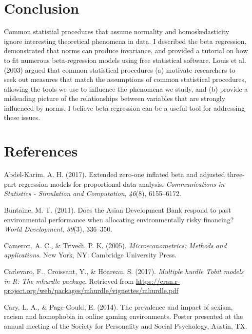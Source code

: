 \documentclass[english,man]{apa6}
\theoremstyle{definition}
\theoremstyle{definition}
\theoremstyle{remark}
\begin{document}
\section{Conclusion}\label{conclusion}

Common statistial procedures that assume normality and homoskedasticity
ignore interesting theoretical phenomena in data. I described the beta
regression, demonstrated that norms can produce invariance, and provided
a tutorial on how to fit numerous beta-regression models using free
statistical software. Louis et al. (2003) argued that common statistical
procedures (a) motivate researchers to seek out measures that match the
assumptions of common statistical procedures, allowing the tools we use
to influence the phenomena we study, and (b) provide a misleading
picture of the relationships between variables that are strongly
influenced by norms. I believe beta regression can be a useful tool for
addressing these issues.

\newpage

\section{References}\label{references}

\setlength{\parindent}{-0.5in} \setlength{\leftskip}{0.5in}

\hypertarget{refs}{}
\hypertarget{ref-abdel2017extended}{}
Abdel-Karim, A. H. (2017). Extended zero-one inflated beta and adjusted
three-part regression models for proportional data analysis.
\emph{Communications in Statistics - Simulation and Computation},
\emph{46}(8), 6155--6172.

\hypertarget{ref-buntaine2011does}{}
Buntaine, M. T. (2011). Does the Asian Development Bank respond to past
environmental performance when allocating environmentally risky
financing? \emph{World Development}, \emph{39}(3), 336--350.

\hypertarget{ref-cameron2005microeconometrics}{}
Cameron, A. C., \& Trivedi, P. K. (2005). \emph{Microeconometrics:
Methods and applications}. New York, NY: Cambridge University Press.

\hypertarget{ref-carlevaro2016multiple}{}
Carlevaro, F., Croissant, Y., \& Hoareau, S. (2017). \emph{Multiple
hurdle Tobit models in R: The mhurdle package}. Retrieved from
\url{https://cran.r-project.org/web/packages/mhurdle/vignettes/mhurdle.pdf}

\hypertarget{ref-cary2014prevalence}{}
Cary, L. A., \& Page-Gould, E. (2014). The prevalence and impact of
sexism, racism and homophobia in online gaming environments. Poster
presented at the annual meeting of the Society for Personality and
Social Psychology, Austin, TX.
\end{document}
